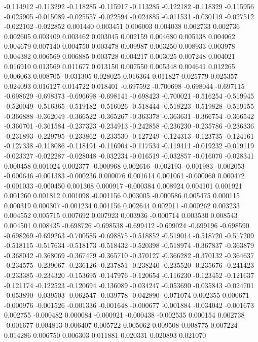 -0.114912
-0.113292
-0.118285
-0.115917
-0.113285
-0.122182
-0.118329
-0.115956
-0.025905
-0.015089
-0.025557
-0.022594
-0.024885
-0.011531
-0.030119
-0.027512
-0.022102
-0.022852
0.001440
0.003451
0.006003
0.004038
0.002733
0.002736
0.002605
0.003409
0.003462
0.003045
0.002159
0.004680
0.005138
0.004062
0.004679
0.007140
0.004750
0.003478
0.009987
0.003250
0.008933
0.003978
0.004382
0.006569
0.006885
0.003728
0.004217
0.003025
0.007248
0.004021
0.016910
0.013569
0.011677
0.013150
0.007550
0.005348
0.004641
0.012265
0.006063
0.008705
-0.031305
0.028025
0.016364
0.011827
0.025779
0.025357
0.024093
0.016127
0.014722
0.018401
-0.697592
-0.700698
-0.698044
-0.697115
-0.698629
-0.698373
-0.696698
-0.698141
-0.698423
-0.700021
-0.516254
-0.519945
-0.520049
-0.516365
-0.519182
-0.516026
-0.518444
-0.518223
-0.519828
-0.519155
-0.366888
-0.362049
-0.366522
-0.365267
-0.363378
-0.363631
-0.366754
-0.366542
-0.366701
-0.361584
-0.237323
-0.234913
-0.242858
-0.236230
-0.235786
-0.236336
-0.231893
-0.229795
-0.233862
-0.233530
-0.127249
-0.124313
-0.123735
-0.124161
-0.127338
-0.118086
-0.118191
-0.116904
-0.117534
-0.119411
-0.019232
-0.019119
-0.023327
-0.022287
-0.028048
-0.032234
-0.016519
-0.032857
-0.016070
-0.028341
0.000458
0.001024
0.002377
-0.000968
0.002616
-0.002193
-0.001983
-0.002053
-0.000646
-0.001383
-0.000236
0.000076
0.001614
0.001061
-0.000060
0.000472
-0.001033
-0.000450
0.001308
0.000917
-0.000384
0.008924
0.004101
0.001921
0.001260
0.001812
0.001098
-0.001156
0.003005
-0.000586
0.005475
0.000115
0.000319
0.000307
-0.001234
0.001156
0.002644
0.002911
-0.000262
0.003233
0.004552
0.005715
0.007692
0.007923
0.003936
-0.000714
0.003530
0.008543
0.004501
0.008435
-0.698726
-0.698538
-0.699412
-0.699024
-0.699196
-0.698590
-0.698269
-0.699263
-0.700585
-0.698875
-0.518852
-0.519014
-0.518720
-0.517209
-0.518115
-0.517634
-0.518173
-0.518432
-0.520398
-0.518974
-0.367837
-0.363879
-0.368042
-0.368069
-0.367479
-0.365710
-0.370127
-0.366282
-0.370132
-0.364637
-0.234575
-0.239067
-0.236126
-0.237851
-0.238240
-0.235520
-0.235676
-0.241423
-0.233385
-0.234320
-0.153695
-0.147976
-0.120654
-0.116230
-0.123452
-0.121637
-0.121174
-0.122523
-0.120694
-0.136089
-0.034247
-0.053690
-0.035843
-0.024701
-0.053890
-0.039503
-0.062547
-0.039778
-0.042890
-0.071074
0.002355
0.000671
-0.000976
-0.001526
-0.001336
-0.001648
-0.000677
-0.001884
-0.034042
-0.001673
0.002755
-0.000482
0.000084
-0.000921
-0.000438
-0.002535
0.000154
0.002738
-0.001677
0.004813
0.006407
0.005722
0.005062
0.009508
0.008775
0.007224
0.014286
0.006750
0.006303
0.011881
0.020331
0.020893
0.021070
